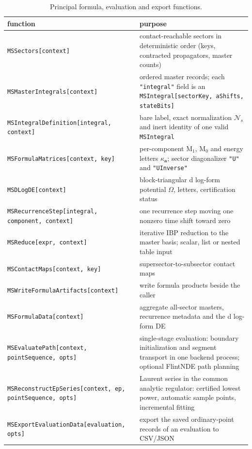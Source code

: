 \documentclass[11pt,a4paper]{article}
\numberwithin{table}{section}
\newcommand{\cN}{\mathcal N}
\begin{document}
\begin{table}[htbp]
\centering
\begin{tabular}{@{}p{7.1cm}p{7.3cm}@{}}
\toprule
function & purpose\\
\midrule
\texttt{MSSectors[context]} & contact-reachable sectors in deterministic order (keys, contracted
propagators, master counts)\\
\texttt{MSMasterIntegrals[context]} & ordered master records; each \texttt{"integral"} field is an
\texttt{MSIntegral[sectorKey, aShifts, stateBits]}\\
\texttt{MSIntegralDefinition[integral, context]} & bare label, exact normalization $\cN_s$ and
inert identity of one valid \texttt{MSIntegral}\\
\texttt{MSFormulaMatrices[context, key]} & per-component $\text{M}_1$, $\text{M}_0$ and energy letters $\kappa_{\bm a}$;
sector diagonalizer \texttt{"U"} and \texttt{"UInverse"}\\
\texttt{MSDLogDE[context]} & block-triangular d log-form potential $\Omega$, letters, certification
status\\
\texttt{MSRecurrenceStep[integral, component, context]} & one recurrence step moving one nonzero
time shift toward zero\\
\texttt{MSReduce[expr, context]} & iterative IBP reduction to the master basis; scalar, list or nested table input\\
\texttt{MSContactMaps[context, key]} & supersector-to-subsector contact maps\\
\texttt{MSWriteFormulaArtifacts[context]} & write formula products beside the caller\\
\texttt{MSFormulaData[context]} & aggregate all-sector masters, recurrence metadata and the d log-form DE\\
\texttt{MSEvaluatePath[context, pointSequence, opts]} & single-stage evaluation: boundary initialization and segment transport in one backend process; optional FlintNDE path planning\\
\texttt{MSReconstructEpSeries[context, ep, pointSequence, opts]} & Laurent series in the common analytic regulator: certified lowest power, automatic sample points, incremental fitting\\
\texttt{MSExportEvaluationData[evaluation, opts]} & export the saved ordinary-point records of an evaluation to CSV/JSON\\
\bottomrule
\end{tabular}
\caption{Principal formula, evaluation and export functions.}
\label{tab:core-functions}
\end{table}
\FloatBarrier
\end{document}
